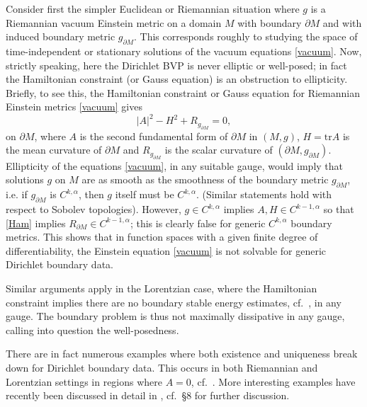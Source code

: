 \documentclass[10pt]{amsart}
\renewcommand{\a}{\alpha}
\newcommand{\be}{\begin{equation}}
\newcommand{\ee}{\end{equation}}
\newcommand{\tr}{\mathrm{tr}}
\newcommand{\<}{\langle}
\renewcommand{\>}{\rangle}
\newcommand{\dm}{{\partial M}}
\theoremstyle{plain}
\theoremstyle{remark}
\theoremstyle{definition}
\numberwithin{equation}{section}
\begin{document}
 
\medskip 

  Consider first the simpler Euclidean or Riemannian situation where $g$ is a Riemannian vacuum Einstein metric on a domain $M$ with 
boundary $\dm$ and with induced boundary metric $g_{\dm}$. This corresponds roughly to studying the space of time-independent or stationary 
solutions of the vacuum equations \eqref{vacuum}. Now, strictly speaking, here the Dirichlet BVP is never elliptic or well-posed; in fact the Hamiltonian constraint 
(or Gauss equation) is an obstruction to ellipticity. Briefly, to see this, the Hamiltonian constraint or Gauss equation for Riemannian Einstein metrics \eqref{vacuum} 
gives 
\be \label{Ham}
|A|^2 - H^2 + R_{g_{\dm}} = 0,
\ee
on $\dm$, where $A$ is the second fundamental form of $\dm$ in $(M, g)$, $H = \tr A$ is the mean curvature of $\dm$ and $R_{g_{\dm}}$ is the scalar curvature 
of $(\dm, g_{\dm})$. Ellipticity of the equations \eqref{vacuum}, in any suitable gauge, would imply that solutions $g$ on $M$ are as smooth as the smoothness of the 
boundary metric $g_{\dm}$, i.e. if $g_{\dm}$ is $C^{k,\a}$, then $g$ itself must be $C^{k,\a}$. (Similar statements hold with respect to Sobolev topologies). 
However, $g \in C^{k,\a}$ implies $A, H \in C^{k-1,\a}$ so that \eqref{Ham} implies $R_{\dm} \in C^{k-1,\a}$; this is clearly false for generic $C^{k,\a}$ boundary metrics. 
This shows that in function spaces with a given finite degree of differentiability, the Einstein equation \eqref{vacuum} is not solvable for generic Dirichlet 
boundary data. 

  Similar arguments apply in the Lorentzian case, where the Hamiltonian constraint implies there are no boundary stable energy estimates, cf.~\cite{A3}, 
in any gauge. The boundary problem is thus not maximally dissipative in any gauge, calling into question the well-posedness. 

  There are in fact numerous examples where both existence and uniqueness break down for Dirichlet boundary data. This occurs in both 
Riemannian and Lorentzian settings in regions where $A = 0$, cf.~\cite{AA2}. More interesting examples have recently been discussed in detail in 
\cite{AGAM}, cf.~\S 8 for further discussion.  

\medskip 
\end{document}
